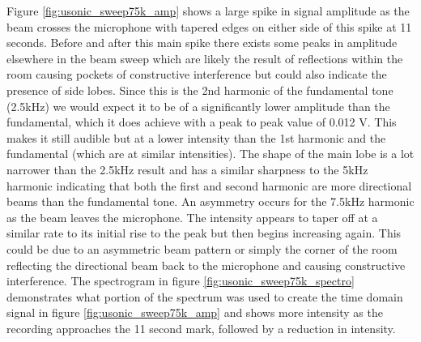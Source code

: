 Figure \ref{fig:usonic_sweep75k_amp} shows a large spike in signal amplitude as the beam crosses the microphone with tapered edges on either side of this spike at 11 seconds. Before and after this main spike there exists some peaks in amplitude elsewhere in the beam sweep which are likely the result of reflections within the room causing pockets of constructive interference but could also indicate the presence of side lobes. Since this is the 2nd harmonic of the fundamental tone (2.5kHz) we would expect it to be of a significantly lower amplitude than the fundamental, which it does achieve with a peak to peak value of 0.012 V. This makes it still audible but at a lower intensity than the 1st harmonic and the fundamental (which are at similar intensities).
The shape of the main lobe is a lot narrower than the 2.5kHz result and has a similar sharpness to the 5kHz harmonic indicating that both the first and second harmonic are more directional beams than the fundamental tone. An asymmetry occurs for the 7.5kHz harmonic as the beam leaves the microphone. The intensity appears to taper off at a similar rate to its initial rise to the peak but then begins increasing again. This could be due to an asymmetric beam pattern or simply the corner of the room reflecting the directional beam back to the microphone and causing constructive interference.
The spectrogram in figure \ref{fig:usonic_sweep75k_spectro} demonstrates what portion of the spectrum was used to create the time domain signal in figure \ref{fig:usonic_sweep75k_amp} and shows more intensity as the recording approaches the 11 second mark, followed by a reduction in intensity.